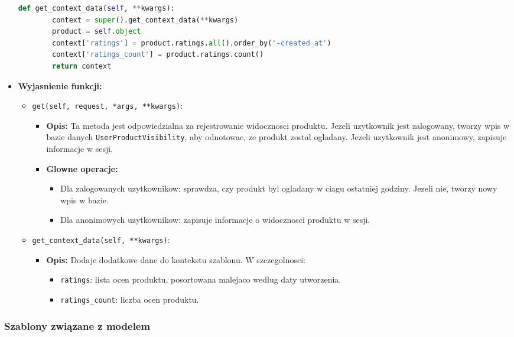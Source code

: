 \documentclass[12pt,a4paper,oneside]{article}
\theoremstyle{definition}
\numberwithin{equation}{section}
\begin{document}
\begin{itemize}
\begin{lstlisting}[language=Python, caption=Kod widoku ProductDetailView]
    def get_context_data(self, **kwargs):
        context = super().get_context_data(**kwargs)
        product = self.object
        context['ratings'] = product.ratings.all().order_by('-created_at')
        context['ratings_count'] = product.ratings.count()
        return context
\end{lstlisting}
    \item \textbf{Wyjasnienie funkcji:}
    \begin{itemize}
        \item \texttt{get(self, request, *args, **kwargs)}:
        \begin{itemize}
            \item \textbf{Opis:} Ta metoda jest odpowiedzialna za rejestrowanie widocznosci produktu. Jezeli uzytkownik jest zalogowany, tworzy wpis w bazie danych \texttt{UserProductVisibility}, aby odnotowac, ze produkt zostal ogladany. Jezeli uzytkownik jest anonimowy, zapisuje informacje w sesji.
            \item \textbf{Glowne operacje:}
            \begin{itemize}
                \item Dla zalogowanych uzytkownikow: sprawdza, czy produkt byl ogladany w ciagu ostatniej godziny. Jezeli nie, tworzy nowy wpis w bazie.
                \item Dla anonimowych uzytkownikow: zapisuje informacje o widocznosci produktu w sesji.
            \end{itemize}
        \end{itemize}
        \item \texttt{get\_context\_data(self, **kwargs)}:
        \begin{itemize}
            \item \textbf{Opis:} Dodaje dodatkowe dane do kontekstu szablonu. W szczegolnosci:
            \begin{itemize}
                \item \texttt{ratings}: lista ocen produktu, posortowana malejaco wedlug daty utworzenia.
                \item \texttt{ratings\_count}: liczba ocen produktu.
            \end{itemize}
        \end{itemize}
    \end{itemize}
\end{itemize}


\subsubsection*{Szablony związane z modelem}
\end{document}
